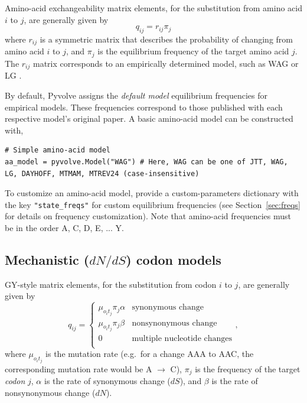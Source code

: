 \documentclass{article}
\newcommand{\code}[1]{\texttt{\small{#1}}}
\begin{document}
Amino-acid exchangeability matrix elements, for the substitution from amino acid $i$ to $j$, are generally given by 
\begin{equation}
q_{ij} = r_{ij} \pi_j
\end{equation}
where $r_{ij}$ is a symmetric matrix that describes the probability of changing from amino acid $i$ to $j$, and $\pi_j$ is the equilibrium frequency of the target amino acid $j$. The $r_{ij}$ matrix corresponds to an empirically determined model, such as WAG \citep{WAG} or LG \citep{LG}. 

By default, Pyvolve assigns the \emph{default model} equilibrium frequencies for empirical models. These frequencies correspond to those published with each respective model's original paper.  A basic amino-acid model can be constructed with, 
\begin{lstlisting}
# Simple amino-acid model 
aa_model = pyvolve.Model("WAG") # Here, WAG can be one of JTT, WAG, LG, DAYHOFF, MTMAM, MTREV24 (case-insensitive)
\end{lstlisting}

To customize an amino-acid model, provide a custom-parameters dictionary with the key \code{"state\_freqs"} for custom equilibrium frequencies (see Section~\ref{sec:freqs} for details on frequency customization). Note that amino-acid frequencies must be in the order A, C, D, E, ... Y.



\subsection{Mechanistic ($dN/dS$) codon models}\label{sec:mechcodon_basic}

GY-style \citep{GY94} matrix elements, for the substitution from codon $i$ to $j$, are generally given by 
\begin{equation}\label{eq:GY94}
q_{ij} = \left\{ 
\begin{array}{rl}
\mu_{o_it_j} \pi_j \alpha      & \text{synonymous change} \\
\mu_{o_it_j} \pi_j \beta       & \text{nonsynonymous change} \\
0                    & \text{multiple nucleotide changes} \\             
\end{array} \right.,
\end{equation}
where $\mu_{o_it_j}$ is the mutation rate (e.g.\ for a change AAA to AAC, the corresponding mutation rate would be A $\rightarrow$ C), $\pi_j$ is the frequency of the target \emph{codon} $j$, $\alpha$ is the rate of synonymous change ($dS$), and $\beta$ is the rate of nonsynonymous change ($dN$).
\end{document}
